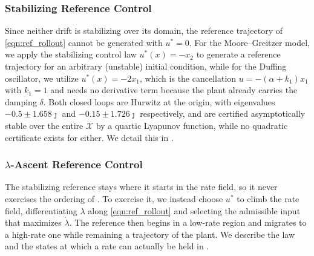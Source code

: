 \documentclass[lettersize,journal]{IEEEtran}
\begin{document}
\subsubsection{Stabilizing Reference Control}\label{subsubsec:stabilizing_ref}
Since neither drift is stabilizing over its domain, the reference trajectory of \eqref{eqn:ref_rollout} cannot be generated with $u^* = 0$. 
For the Moore--Greitzer model, we apply the stabilizing control law $u^*(x) = -x_2$ to generate a reference trajectory for an arbitrary (unstable) initial condition, 
while for the Duffing oscillator, we utilize $u^*(x) = -2x_1$, 
which is the cancellation $u = -(\alpha + k_1)x_1$ with $k_1 = 1$ and needs no derivative term because the plant already carries the damping $\delta$. 
Both closed loops are Hurwitz at the origin, with eigenvalues $-0.5 \pm 1.658\jmath$ and $-0.15 \pm 1.726\jmath$ respectively, 
and are certified asymptotically stable over the entire $\mathcal{X}$ by a quartic Lyapunov function, 
while no quadratic certificate exists for either. 
We detail this in .

\subsubsection{$\lambda$-Ascent Reference Control}\label{subsubsec:lambda_ascent}
The stabilizing reference stays where it starts in the rate field, so it never exercises the ordering of . 
To exercise it, we instead choose $u^*$ to climb the rate field, 
differentiating $\lambda$ along \eqref{eqn:ref_rollout} and selecting the admissible input that maximizes $\dot{\lambda}$. 
The reference then begins in a low-rate region and migrates to a high-rate one while remaining a trajectory of the plant. 
We describe the law and the states at which a rate can actually be held in .
\end{document}
